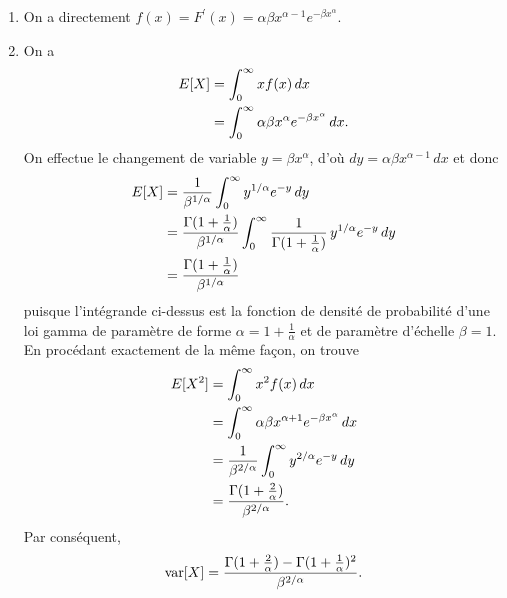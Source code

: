 \begin{solution}{1.3}
    \begin{enumerate}
    \item On a directement $f(x) = F^\prime(x) = \alpha \beta x^{\alpha
        - 1} e^{-\beta x^{\alpha}}$.
    \item On a
      \begin{align*}
        E [ X ]
        &= \int_0^\infty x f(x)\, dx \\
        &= \int_0^\infty \alpha \beta x^{\alpha} e^{-\beta x^{\alpha}}\,
        dx.
      \end{align*}
      On effectue le changement de variable $y = \beta x^{\alpha}$,
      d'où $dy = \alpha \beta x^{\alpha - 1}\, dx$ et donc
      \begin{align*}
        E [ X ]
        &= \frac{1}{\beta^{1/\alpha}}
        \int_0^\infty y^{1/\alpha} e^{-y} \,dy \\
        &= \frac{\Gamma(1 + \frac{1}{\alpha})}{\beta^{1/\alpha}}
        \int_0^\infty \frac{1}{\Gamma(1 + \frac{1}{\alpha})}\,
        y^{1/\alpha} e^{-y} \,dy \\
        &= \frac{\Gamma(1 + \frac{1}{\alpha})}{\beta^{1/\alpha}}
      \end{align*}
      puisque l'intégrande ci-dessus est la fonction de densité de
      probabilité d'une loi gamma de paramètre de forme $\alpha = 1 +
      \frac{1}{\alpha}$ et de paramètre d'échelle $\beta = 1$. En
      procédant exactement de la même façon, on trouve
      \begin{align*}
        E [ X^2 ]
        &= \int_0^\infty x^2 f(x)\, dx \\
        &= \int_0^\infty \alpha \beta x^{\alpha + 1} e^{-\beta x^{\alpha}}\,
        dx \\
        &= \frac{1}{\beta^{2/\alpha}}
        \int_0^\infty y^{2/\alpha} e^{-y} \, dy \\
        &= \frac{\Gamma(1 + \frac{2}{\alpha})}{\beta^{2/\alpha}}.
      \end{align*}
      Par conséquent,
      \begin{equation*}
        \mathrm{var} [ X ] = \frac{\Gamma(1 + \frac{2}{\alpha}) -
          \Gamma(1 + \frac{1}{\alpha})^2}{\beta^{2/\alpha}}.
      \end{equation*}
    \end{enumerate}
  
\end{solution}

